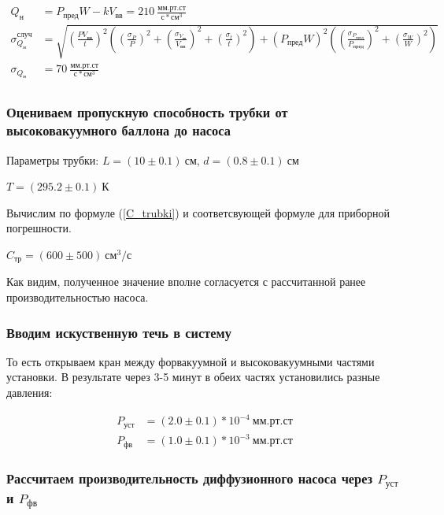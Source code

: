 \documentclass[a4paper, 12pt]{article}
\begin{document}
            \begin{align*}
                Q_н &= P_{пред} W - k V_{вв} = 210~\frac{мм.рт.ст}{с*см^3}\\
                \sigma_{Q_н}^{случ} &= \sqrt{ \left( \frac{P V_{вв}}{t} \right)^2 \left( \left( \frac{\sigma_P}{P} \right)^2 + \left( \frac{\sigma_{V_{вв}}}{V_{вв}} \right)^2 + \left( \frac{\sigma_t}{t} \right)^2 \right) + \left( P_{пред} W \right)^2 \left( \left( \frac{\sigma_{P_{пред}}}{P_{пред}} \right)^2 + \left( \frac{\sigma_W}{W} \right)^2 \right)}\\
                \sigma_{Q_н} &= 70~\frac{мм.рт.ст}{с*см^3}\\
            \end{align*}

        \subsubsection{Оцениваем пропускную способность трубки от высоковакуумного баллона до насоса}

            Параметры трубки: $L = (10 \pm 0.1)~см$, $d = (0.8 \pm 0.1)~см$

            $T = (295.2 \pm 0.1)~К$

            Вычислим по формуле (\ref{C_trubki}) и соответсвующей формуле для приборной погрешности.

            $C_{тр} = (600 \pm 500)~см^3/с$

            Как видим, полученное значение вполне согласуется с рассчитанной ранее производительностью насоса.

        \subsubsection{Вводим искуственную течь в систему}

            То есть открываем кран между форвакуумной и высоковакуумными частями установки. В результате через 3-5 минут в обеих частях установились разные давления:

            \begin{align*}
                P_{уст} &= (2.0 \pm 0.1)*10^{-4}~мм.рт.ст\\
                P_{фв} &= (1.0 \pm 0.1)*10^{-3}~мм.рт.ст
            \end{align*}

        \subsubsection{Рассчитаем производительность диффузионного насоса через $P_{уст}$ и $P_{фв}$}
\end{document}
